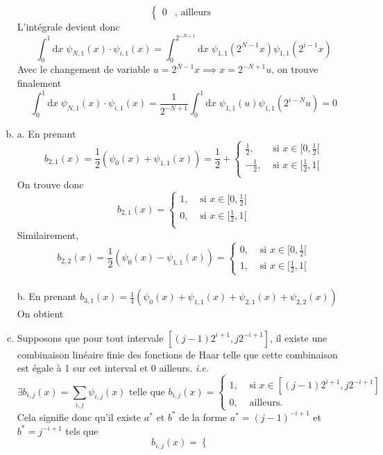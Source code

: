 \documentclass[letterpaper,12pt,oneside,final]{book}
\begin{document}
\begin{enumerate}[a)]
\[\begin{cases}
0 &, \text{ ailleurs }
\end{cases} \]
L'intégrale devient donc 
\[ \int_{0}^{1}\text{d}x\; \psi_{N,1}(x)\cdot \psi_{i,1}(x) = \int_{0}^{2^{-N+1}}\text{d}x\; \psi_{1,1}(2^{N-1}x)\psi_{1,1}(2^{i-1}x) \]
Avec le changement de variable \( u = 2^{N-1}x \implies x = 2^{-N+1}u \), on trouve finalement 
\[ \int_{0}^{1}\text{d}x\; \psi_{N,1}(x)\cdot \psi_{i,1}(x)  =\frac{1}{2^{-N+1}} \int_{0}^{1}\text{d}x\; \psi_{1,1}(u)\psi_{1,1}(2^{i-N}u) = 0\] 


\item %
a.
En prenant
\[ b_{2,1}(x) = \frac{1}{2}(\psi_{0}(x)+\psi_{1,1}(x)) = \frac{1}{2} + \begin{cases}
    \frac{1}{2}, & \text{ si } x\in [0,\frac{1}{2}[\\ 
    -\frac{1}{2}, & \text{ si } x\in[\frac{1}{2},1[\\ 
\end{cases}\]
On trouve donc
\[ b_{2,1}(x) = \begin{cases}
    1, & \text{ si } x \in [0,\frac{1}{2}[\\ 
    0, & \text{ si } x\in[\frac{1}{2},1[\\
\end{cases} \]
Similairement,
\[ b_{2,2}(x) = \frac{1}{2}(\psi_{0}(x) - \psi_{1,1}(x)) = \begin{cases}
     0, & \text{ si } x\in [0,\frac{1}{2}[\\ 
    1, & \text{ si } x\in [\frac{1}{2},1[
\end{cases} \]\\ 
b. 
En prenant \(b_{3,1}(x) = \frac{1}{4}(\psi_{0}(x)+\psi_{1,1}(x)+\psi_{2,1}(x)+\psi_{2,2}(x))\)
On obtient
\item 
 Supposons que pour tout intervale \( [(j-1)2^{i+1},j2^{-i+1}] \), 
 il existe une combinaison linéaire finie des fonctions de Haar telle que cette combinaison est égale à 1 sur cet interval et 0 ailleurs. 
\textit{i.e.}
\[ \exists b_{i,j}(x) = \sum_{i,j} \psi_{i,j}(x) \text{ telle que } b_{i,j}(x) = \begin{cases}
    1, & \text{ si } x\in [(j-1)2^{i+1},j2^{-i+1}]\\ 
    0, & \text{ ailleurs.}
\end{cases}
\]
Cela signifie donc qu'il existe \( a^{*} \) et \( b^{*} \) de la forme \( a^{*} = (j-1)^{-i+1} \) et \( b^{*} = j^{-i+1} \) tels que 
\[ b_{i,j}(x) = \begin{cases}

\end{cases}\]
\end{enumerate}
\end{document}
